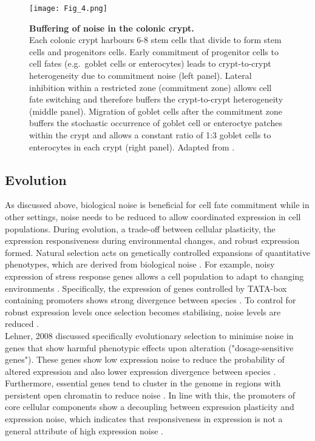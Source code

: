 \begin{figure}[!h]
\centering
\texttt{[image: Fig\_4.png]}
\caption[Buffering of noise in the colonic crypt]{\textbf{Buffering of noise in the colonic crypt.}\\
Each colonic crypt harbours 6-8 stem cells that divide to form stem cells and progenitors cells. Early commitment of progenitor cells to cell fates (e.g.~goblet cells or enterocytes) leads to crypt-to-crypt heterogeneity due to commitment noise (left panel). Lateral inhibition within a restricted zone (commitment zone) allows cell fate switching and therefore buffers the crypt-to-crypt heterogeneity (middle panel). Migration of goblet cells after the commitment zone buffers the stochastic occurrence of goblet cell or enteroctye patches within the crypt and allows a constant ratio of 1:3 goblet cells to enterocytes in each crypt (right panel). Adapted from \citep{Toth2017}.}
\label{fig0:noise_tissue}
\end{figure}

\subsection{Evolution}

As discussed above, biological noise is beneficial for cell fate commitment while in other settings, noise needs to be reduced to allow coordinated expression in cell populations. During evolution, a trade-off between cellular plasticity, the expression responsiveness during environmental changes, and robust expression formed. Natural selection acts on genetically controlled expansions of quantitative phenotypes, which are derived from biological noise \citep{Eldar2010}. For example, noisy expression of stress response genes allows a cell population to adapt to changing environments \citep{Lopez-Maury2009}. Specifically, the expression of genes controlled by TATA-box containing promoters shows strong divergence between species \citep{Tirosh2006}. To control for robust expression levels once selection becomes stabilising, noise levels are reduced \citep{Lopez-Maury2009, Eldar2010, Pires2016}. \\

Lehner, 2008 discussed specifically evolutionary selection to minimise noise in genes that show harmful phenotypic effects upon alteration ("dosage-sensitive genes"). These genes show low expression noise to reduce the probability of altered expression and also lower expression divergence between species \citep{Lehner2008}. Furthermore, essential genes tend to cluster in the genome in regions with persistent open chromatin to reduce noise \citep{Batada2007}. In line with this, the promoters of core cellular components show a decoupling between expression plasticity and expression noise, which indicates that responsiveness in expression is not a general attribute of high expression noise \citep{Lehner2010a}. \\

